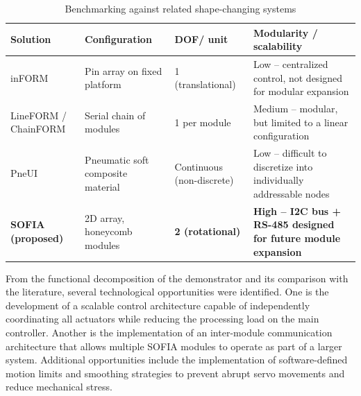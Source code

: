 \documentclass[lettersize,journal]{IEEEtran}
\begin{document}
	\begin{table}[!t]
		\centering
		\caption{Benchmarking against related shape-changing systems}
		\label{tab:benchmarking}
		\scriptsize
		
		\setlength{\tabcolsep}{2pt}
		\renewcommand{\arraystretch}{1.05}
		
		\begin{tabularx}{\columnwidth}
			{@{}P{1.7cm} P{1.7cm} P{1.5cm} Y@{}}
			
			\toprule
			Solution & Configuration & DOF/ unit & Modularity / scalability\\
			\midrule
			
			inFORM \cite{follmer2013inform} &
			Pin array on fixed platform &
			1 (translational) &
			Low -- centralized control, not designed for modular expansion \\
			
			LineFORM / ChainFORM \cite{nakagaki2015lineform,nakagaki2016chainform} &
			Serial chain of modules &
			1 per module &
			Medium -- modular, but limited to a linear configuration \\
			
			PneUI \cite{yao2013pneui} &
			Pneumatic soft composite material &
			Continuous (non-discrete) &
			Low -- difficult to discretize into individually addressable nodes \\
			
			\textbf{SOFIA (proposed)} &
			2D array, honeycomb modules &
			\textbf{2 (rotational)} &
			\textbf{High -- I2C bus + RS-485 designed for future module expansion} \\
			
			\bottomrule
			
		\end{tabularx}
	\end{table}
	
	From the functional decomposition of the demonstrator and its comparison with
	the literature, several technological opportunities were identified. One is
	the development of a scalable control architecture capable of independently
	coordinating all actuators while reducing the processing load on the main
	controller. Another is the implementation of an inter-module communication
	architecture that allows multiple SOFIA modules to operate as part of a larger
	system. Additional opportunities include the implementation of
	software-defined motion limits and smoothing strategies to prevent abrupt
	servo movements and reduce mechanical stress.
	
\end{document}

